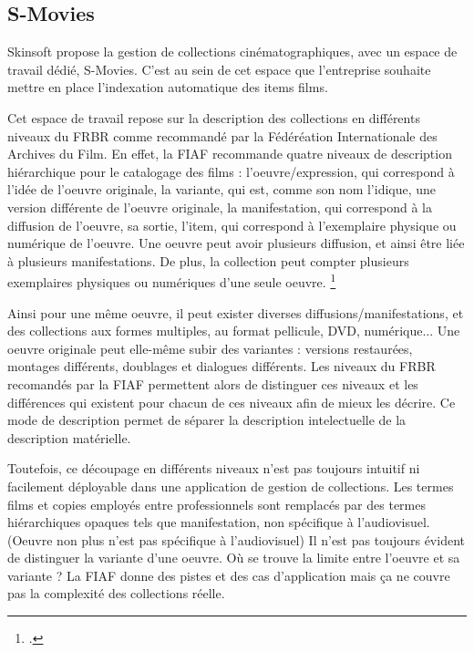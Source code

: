 \subsection{S-Movies}

Skinsoft propose la gestion de collections cinématographiques, avec un espace de travail dédié, S-Movies. C'est au sein de cet espace que l'entreprise souhaite mettre en place l'indexation automatique des items films. 

Cet espace de travail repose sur la description des collections en différents niveaux du FRBR comme recommandé par la Fédéréation Internationale des Archives du Film. En effet, la FIAF recommande quatre niveaux de description hiérarchique pour le catalogage des films : l'oeuvre/expression, qui correspond à l'idée de l'oeuvre originale, la variante, qui est, comme son nom l'idique, une version différente de l'oeuvre originale, la manifestation, qui correspond à la diffusion de l'oeuvre, sa sortie, l'item, qui correspond à l'exemplaire physique ou numérique de l'oeuvre. Une oeuvre peut avoir plusieurs diffusion, et ainsi être liée à plusieurs manifestations. De plus, la collection peut compter plusieurs exemplaires physiques ou numériques d'une seule oeuvre. \footcite{zotero-item-646}


Ainsi pour une même oeuvre, il peut exister diverses diffusions/manifestations, et des collections aux formes multiples, au format pellicule, DVD, numérique... Une oeuvre originale peut elle-même subir des variantes : versions restaurées, montages différents, doublages et dialogues différents. Les niveaux du FRBR recomandés par la FIAF permettent alors de distinguer ces niveaux et les différences qui existent pour chacun de ces niveaux afin de mieux les décrire. Ce mode de description permet de séparer la description intelectuelle de la description matérielle. 

Toutefois, ce découpage en différents niveaux n'est pas toujours intuitif ni facilement déployable dans une application de gestion de collections. Les termes films et copies employés entre professionnels sont remplacés par des termes hiérarchiques opaques tels que manifestation, non spécifique à l'audiovisuel. (Oeuvre non plus n'est pas spécifique à l'audiovisuel)
Il n'est pas toujours évident de distinguer la variante d'une oeuvre. Où se trouve la limite entre l'oeuvre et sa variante ? La FIAF donne des pistes et des cas d'application mais ça ne couvre pas la complexité des collections réelle. 

